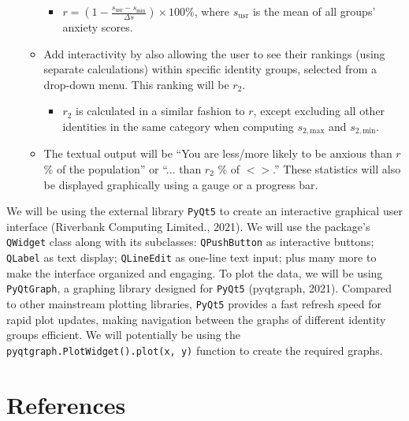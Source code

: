 \documentclass[fontsize=11pt]{article}
\begin{document}
\begin{itemize}
\begin{itemize}
            \begin{itemize}
                \item $r = \left(1 - \frac{s_{\mathrm{usr}} - s_{\mathrm{min}}}{\Delta s}\right) \times 100 \%$, where $s_{\mathrm{usr}}$ is the mean of all groups’ anxiety scores.
            \end{itemize}

            \item Add interactivity by also allowing the user to see their rankings (using separate calculations) within specific identity groups, selected from a drop-down menu. This ranking will be $r_2$.

            \begin{itemize}
                \item $r_2$ is calculated in a similar fashion to $r$, except excluding all other identities in the same category when computing $s_{2,\mathrm{max}}$ and $s_{2,\mathrm{min}}$.
            \end{itemize}

            \item The textual output will be ``You are less/more likely to be anxious than $r$ \% of the population” or “... than $r_2$ \% of $<$$>$.” These statistics will also be displayed graphically using a gauge or a progress bar.

        \end{itemize}

    \end{itemize}

    We will be using the external library \texttt{PyQt5} to create an interactive graphical user interface (Riverbank Computing Limited., 2021). We will use the package’s \texttt{QWidget} class along with its subclasses: \texttt{QPushButton} as interactive buttons; \texttt{QLabel} as text display; \texttt{QLineEdit} as one-line text input; plus many more to make the interface organized and engaging. To plot the data, we will be using \texttt{PyQtGraph}, a graphing library designed for \texttt{PyQt5} (pyqtgraph, 2021). Compared to other mainstream plotting libraries, \texttt{PyQt5} provides a fast refresh speed for rapid plot updates, making navigation between the graphs of different identity groups efficient. We will potentially be using the \texttt{pyqtgraph.PlotWidget().plot(x, y)} function to create the required graphs.

    \section*{References}
\end{document}
